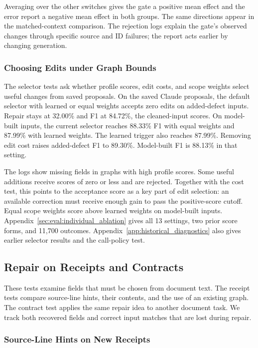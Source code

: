 Averaging over the other switches gives the gate a positive mean effect
and the error report a negative mean effect in both groups.
The same directions appear in the matched-context comparison.
The rejection logs explain the gate's observed changes through specific
source and ID failures; the report acts earlier by changing generation.

\subsubsection{Choosing Edits under Graph Bounds}

The selector tests ask whether profile scores, edit costs, and scope
weights select useful changes from saved proposals.
On the saved Claude proposals, the default selector with learned or equal
weights accepts zero edits on added-defect inputs. Repair stays at 32.00\%
and F1 at 84.72\%, the cleaned-input scores.
On model-built inputs, the current selector reaches 88.33\% F1 with equal
weights and 87.99\% with learned weights. The learned trigger also reaches 87.99\%.
Removing edit cost raises added-defect F1 to 89.30\%.
Model-built F1 is 88.13\% in that setting.

The logs show missing fields in graphs with high profile scores.
Some useful additions receive scores of zero or less and are rejected.
Together with the cost test, this points to the acceptance score as a
key part of edit selection: an available correction must receive enough
gain to pass the positive-score cutoff.
Equal scope weights score above learned weights on model-built inputs.
Appendix~\ref{sec:eval:individual_ablation} gives all 13 settings, two prior
score forms, and 11,700 outcomes. Appendix~\ref{app:historical_diagnostics}
also gives earlier selector results and the call-policy test.

\subsection{Repair on Receipts and Contracts}
\label{sec:eval:documents}

These tests examine fields that must be chosen from document text.
The receipt tests compare source-line hints, their contents, and the use
of an existing graph. The contract test applies the same repair idea to
another document task. We track both recovered fields and correct input
matches that are lost during repair.

\subsubsection{Source-Line Hints on New Receipts}
\label{sec:eval:receipt_followup}

